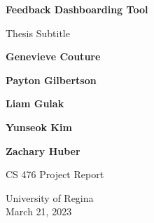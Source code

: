 \begin{titlepage}
    \begin{center}
        \vspace*{2.5cm}
 
        \textbf{Feedback Dashboarding Tool}
 
        \vspace{0.5cm}
         Thesis Subtitle
 
         \vfill
        
 
        \textbf{Genevieve Couture}
 
        \textbf{Payton Gilbertson}
 
        \textbf{Liam Gulak}
 
        \textbf{Yunseok Kim}
 
        \textbf{Zachary Huber}
 
        \vspace{1.5cm}  
        CS 476 Project Report
             
        \vspace{0.8cm}
      
             
        University of Regina\\
        March 21, 2023
             
    \end{center}
 \end{titlepage}